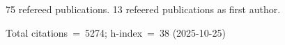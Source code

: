 75 refereed publications. 13 refeered publications as first author.

Total citations~=~5274; h-index~=~38 (2025-10-25)
